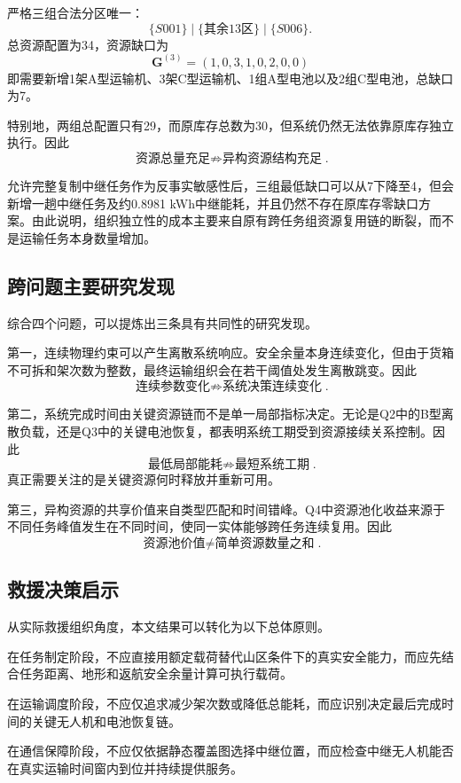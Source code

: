 \documentclass[UTF8,a4paper,12pt]{ctexart}
\begin{document}
严格三组合法分区唯一：
\[
\boxed{
\{S001\}
\mid
\{\text{其余13区}\}
\mid
\{S006\}
}.
\]
总资源配置为34，资源缺口为
\[
\boxed{
\mathbf G^{(3)}
=
(1,0,3,1,0,2,0,0)
}
\]
即需要新增1架A型运输机、3架C型运输机、1组A型电池以及2组C型电池，总缺口为7。

特别地，两组总配置只有29，而原库存总数为30，但系统仍然无法依靠原库存独立执行。因此
\[
\boxed{
\text{资源总量充足}
\not\Rightarrow
\text{异构资源结构充足}
}.
\]

允许完整复制中继任务作为反事实敏感性后，三组最低缺口可以从7下降至4，但会新增一趟中继任务及约0.8981 kWh中继能耗，并且仍然不存在原库存零缺口方案。由此说明，组织独立性的成本主要来自原有跨任务组资源复用链的断裂，而不是运输任务本身数量增加。

\subsection{跨问题主要研究发现}

综合四个问题，可以提炼出三条具有共同性的研究发现。

第一，连续物理约束可以产生离散系统响应。安全余量本身连续变化，但由于货箱不可拆和架次数为整数，最终运输组织会在若干阈值处发生离散跳变。因此
\[
\boxed{
\text{连续参数变化}
\not\Rightarrow
\text{系统决策连续变化}
}.
\]

第二，系统完成时间由关键资源链而不是单一局部指标决定。无论是Q2中的B型离散负载，还是Q3中的关键电池恢复，都表明系统工期受到资源接续关系控制。因此
\[
\boxed{
\text{最低局部能耗}
\not\Rightarrow
\text{最短系统工期}
}.
\]
真正需要关注的是关键资源何时释放并重新可用。

第三，异构资源的共享价值来自类型匹配和时间错峰。Q4中资源池化收益来源于不同任务峰值发生在不同时间，使同一实体能够跨任务连续复用。因此
\[
\boxed{
\text{资源池价值}
\neq
\text{简单资源数量之和}
}.
\]

\subsection{救援决策启示}

从实际救援组织角度，本文结果可以转化为以下总体原则。

在任务制定阶段，不应直接用额定载荷替代山区条件下的真实安全能力，而应先结合任务距离、地形和返航安全余量计算可执行载荷。

在运输调度阶段，不应仅追求减少架次数或降低总能耗，而应识别决定最后完成时间的关键无人机和电池恢复链。

在通信保障阶段，不应仅依据静态覆盖图选择中继位置，而应检查中继无人机能否在真实运输时间窗内到位并持续提供服务。
\end{document}

